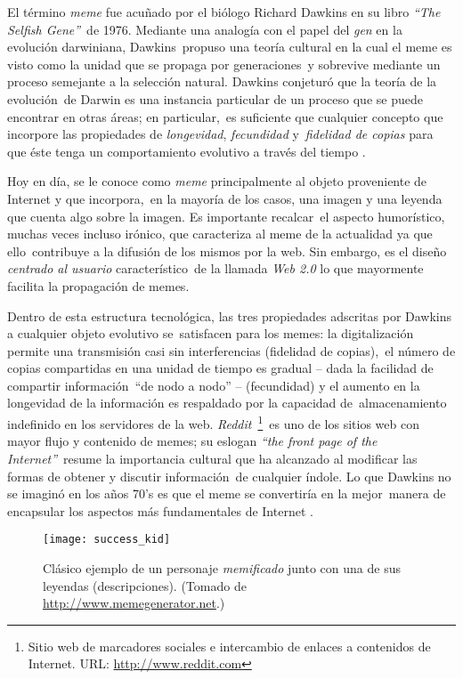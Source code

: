 \noindent
El término \emph{meme} fue acuñado por el biólogo Richard Dawkins en su libro \emph{``The Selfish Gene''}\
de 1976. Mediante una analogía con el papel del \emph{gen} en la evolución darwiniana, Dawkins\
propuso una teoría cultural en la cual el meme es visto como la unidad que se propaga por generaciones\
y sobrevive mediante un proceso semejante a la selección natural. Dawkins conjeturó que la teoría de la evolución\
de Darwin es una instancia particular de un proceso que se puede encontrar en otras áreas; en particular,\
es suficiente que cualquier concepto que incorpore las propiedades de \emph{longevidad}, \emph{fecundidad} y\
\emph{fidelidad de copias} para que éste tenga un comportamiento evolutivo a través del tiempo \cite{distin2005}.\par
Hoy en día, se le conoce como \emph{meme} principalmente al objeto proveniente de Internet y que incorpora,\
en la mayoría de los casos, una imagen y una leyenda que cuenta algo sobre la imagen. Es importante recalcar\
el aspecto humorístico, muchas veces incluso irónico, que caracteriza al meme de la actualidad ya que ello\
contribuye a la difusión de los mismos por la web. Sin embargo, es el diseño \emph{centrado al usuario} característico\
de la llamada \emph{Web 2.0} lo que mayormente facilita la propagación de memes.\par
Dentro de esta estructura tecnológica, las tres propiedades adscritas por Dawkins a cualquier objeto evolutivo se\
satisfacen para los memes: la digitalización permite una transmisión casi sin interferencias (fidelidad de copias),\
el número de copias compartidas en una unidad de tiempo es gradual -- dada la facilidad de compartir información\
``de nodo a nodo'' -- (fecundidad) y el aumento en la longevidad de la información es respaldado por la capacidad de\
almacenamiento indefinido en los servidores de la web. \emph{Reddit}\
\footnote{Sitio web de marcadores sociales e intercambio de enlaces a contenidos de Internet. URL: \url{http://www.reddit.com}}\
es uno de los sitios web con mayor flujo y contenido de memes; su eslogan \emph{``the front page of the Internet''}\
resume la importancia cultural que ha alcanzado al modificar las formas de obtener y discutir información\
de cualquier índole. Lo que Dawkins no se imaginó en los años 70's es que el meme se convertiría en la mejor\
manera de encapsular los aspectos más fundamentales de Internet \cite{shifman2014}.

\begin{figure}
  \centering
  \texttt{[image: success\_kid]}
  \caption{Clásico ejemplo de un personaje \emph{memificado} junto con una de sus
    leyendas (descripciones). (Tomado de \url{http://www.memegenerator.net}.)}
\end{figure}


